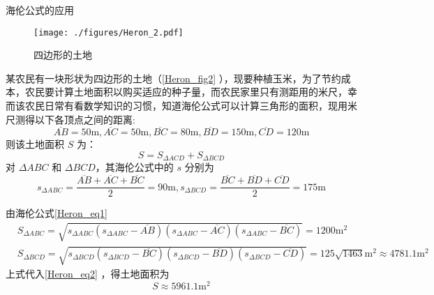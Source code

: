 \begin{example}{海伦公式的应用}
\begin{figure}[ht]
\centering
\texttt{[image: ./figures/Heron\_2.pdf]}
\caption{四边形的土地}\label{Heron_fig2}
\end{figure}
某农民有一块形状为四边形的土地（\autoref{Heron_fig2} ），现要种植玉米，为了节约成本，农民要计算土地面积以购买适应的种子量，而农民家里只有测距用的米尺，幸而该农民日常有看数学知识的习惯，知道海伦公式可以计算三角形的面积，现用米尺测得以下各顶点之间的距离:
\begin{equation}
\overline{AB}=50\mathrm{m},\overline{AC}=50\mathrm{m},\overline{BC}=80\mathrm{m},\overline{BD}=150\mathrm{m},\overline{CD}=120\mathrm{m}
\end{equation}
则该土地面积 $S$ 为：
\begin{equation}\label{Heron_eq2}
S=S_{\Delta ACD}+S_{\Delta BCD}
\end{equation}
对 $\Delta ABC$ 和 $\Delta BCD$，其海伦公式中的 $s$ 分别为
\begin{equation}
s_{\Delta ABC}=\frac{\overline{AB}+\overline{AC}+\overline{BC}}{2}=90\mathrm{m}
,
s_{\Delta BCD}=\frac{\overline{BC}+\overline{BD}+\overline{CD}}{2}=175\mathrm{m}
\end{equation}


由海伦公式\autoref{Heron_eq1} 
\begin{equation}
\begin{aligned}
&S_{\Delta ABC}=\sqrt{s_{\Delta ABC}(s_{\Delta ABC}-\overline{AB})(s_{\Delta ABC}-\overline{AC})(s_{\Delta ABC}-\overline{BC})}=1200\mathrm{m^2}
\\
&S_{\Delta BCD}=\sqrt{s_{\Delta BCD}(s_{\Delta BCD}-\overline{BC})(s_{\Delta BCD}-\overline{BD})(s_{\Delta BCD}-\overline{CD})}=125\sqrt{1463}\mathrm{m^2}\approx 4781.1\mathrm{m^2}
\end{aligned}
\end{equation}
上式代入\autoref{Heron_eq2} ，得土地面积为
\begin{equation}
S\approx 5961.1\mathrm{m^2}
\end{equation}
\end{example}
